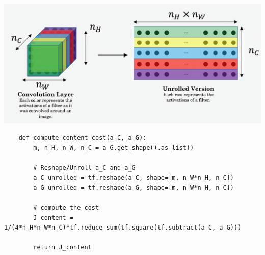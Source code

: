 \documentclass[11pt, a4paper]{article}
\begin{document}
\begin{spacing}{1.1}
	\begin{center} \includegraphics[scale=0.2]{unroll}	\end{center}
	\begin{lstlisting}
	def compute_content_cost(a_C, a_G):
		m, n_H, n_W, n_C = a_G.get_shape().as_list()
		
		# Reshape/Unroll a_C and a_G
		a_C_unrolled = tf.reshape(a_C, shape=[m, n_W*n_H, n_C])
		a_G_unrolled = tf.reshape(a_G, shape=[m, n_W*n_H, n_C])
		
		# compute the cost
		J_content = 1/(4*n_H*n_W*n_C)*tf.reduce_sum(tf.square(tf.subtract(a_C, a_G)))
		
		return J_content \end{lstlisting} \newpage


\end{spacing}
\end{document}
